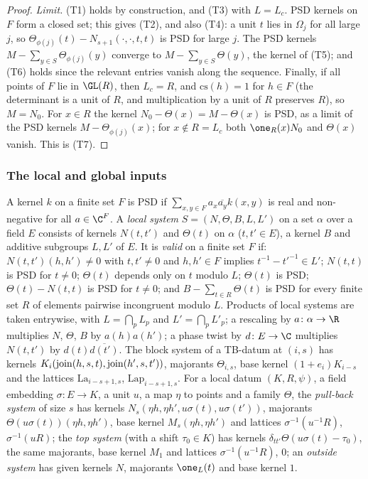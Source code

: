 \begin{proof}
\emph{Limit.} (T1) holds by construction, and (T3) with $L=L_c$. PSD kernels on $F$ form a closed set; this gives (T2), and also
(T4): a unit $t$ lies in $\Omega_j$ for all large $j$, so $\Theta_{\phi(j)}(t)-N_{s+1}(\cdot,\cdot,t,t)$ is PSD for large $j$. The
PSD kernels $M-\sum_{y\in S}\Theta_{\phi(j)}(y)$ converge to $M-\sum_{y\in S}\Theta(y)$, the kernel of (T5); and (T6) holds since
the relevant entries vanish along the sequence. Finally, if all points of $F$ lie in $\GL(R)$, then $L_c=R$, and
$\mathrm{cs}(h)=1$ for $h\in F$ (the determinant is a unit of $R$, and multiplication by a unit of $R$ preserves $R$), so
$M=N_0$. For $x\in R$ the kernel $N_0-\Theta(x)=M-\Theta(x)$ is PSD, as a limit of the PSD kernels $M-\Theta_{\phi(j)}(x)$; for
$x\notin R=L_c$ both $\one_R(x)N_0$ and $\Theta(x)$ vanish. This is (T7).
\end{proof}

\subsubsection{The local and global inputs}\label{sec:pf:thmS:cores}

A kernel $k$ on a finite set $F$ is PSD if $\sum_{x,y\in F}a_x\overline{a_y}k(x,y)$ is real and non-negative for all $a\in\C^F$.
A \emph{local system} $S=(N,\Theta,B,L,L')$ on a set $\alpha$ over a field $E$ consists of kernels $N(t,t')$ and $\Theta(t)$ on
$\alpha$ ($t,t'\in E$), a kernel $B$ and additive subgroups $L,L'$ of $E$. It is \emph{valid} on a finite set $F$ if:
$N(t,t')(h,h')\ne0$ with $t,t'\ne0$ and $h,h'\in F$ implies $t^{-1}-t'^{-1}\in L'$; $N(t,t)$ is PSD for $t\ne0$; $\Theta(t)$
depends only on $t$ modulo $L$; $\Theta(t)$ is PSD; $\Theta(t)-N(t,t)$ is PSD for $t\ne0$; and $B-\sum_{t\in R}\Theta(t)$ is PSD
for every finite set $R$ of elements pairwise incongruent modulo $L$. Products of local systems are taken entrywise, with
$L=\bigcap_pL_p$ and $L'=\bigcap_pL'_p$; a rescaling by $a\colon\alpha\to\R$ multiplies $N$, $\Theta$, $B$ by $a(h)a(h')$; a phase
twist by $d\colon E\to\C$ multiplies $N(t,t')$ by $d(t)\overline{d(t')}$. The block system of a TB-datum at $(i,s)$ has kernels
$K_i(\operatorname{join}(h,s,t),\operatorname{join}(h',s,t'))$, majorants $\Theta_{i,s}$, base kernel $(1+e_i)K_{i-s}$ and the lattices
$\mathrm{La}_{i-s+1,s}$, $\mathrm{Lap}_{i-s+1,s}$. For a local datum $(K,R,\psi)$, a field embedding $\sigma\colon E\to K$, a unit
$u$, a map $\eta$ to points and a family $\Theta$, the \emph{pull-back system} of size $s$ has kernels
$N_s(\eta h,\eta h',u\sigma(t),u\sigma(t'))$, majorants $\Theta(u\sigma(t))(\eta h,\eta h')$, base kernel $M_s(\eta h,\eta h')$
and lattices $\sigma^{-1}(u^{-1}R)$, $\sigma^{-1}(uR)$; the \emph{top system} (with a shift $\tau_0\in K$) has kernels
$\delta_{tt'}\Theta(u\sigma(t)-\tau_0)$, the same majorants, base kernel $M_1$ and lattices $\sigma^{-1}(u^{-1}R)$, $0$; an
\emph{outside system} has given kernels $N$, majorants $\one_L(t)$ and base kernel $1$.

